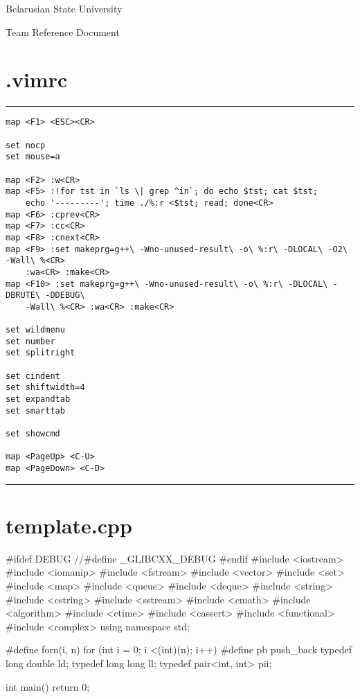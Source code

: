 \documentclass[12pt, titlepage]{article}
\begin{document}
 
\begin{titlepage}
\rule{0pt}{0pt}
\vfill

\centerline{\Huge \textrm{Belarusian State University}}
\vskip 5mm
\centerline{\Large \textsf{Team Reference Document}}

\vfill
\rule{0pt}{0pt}
\end{titlepage}

\section*{.vimrc}

{\color{linescolor}\hrule\vskip2mm}
{\footnotesize\begin{verbatim}
map <F1> <ESC><CR>

set nocp
set mouse=a

map <F2> :w<CR>
map <F5> :!for tst in `ls \| grep ^in`; do echo $tst; cat $tst;
    echo '---------'; time ./%:r <$tst; read; done<CR> 
map <F6> :cprev<CR>
map <F7> :cc<CR>
map <F8> :cnext<CR>
map <F9> :set makeprg=g++\ -Wno-unused-result\ -o\ %:r\ -DLOCAL\ -O2\ -Wall\ %<CR>
    :wa<CR> :make<CR>
map <F10> :set makeprg=g++\ -Wno-unused-result\ -o\ %:r\ -DLOCAL\ -DBRUTE\ -DDEBUG\
    -Wall\ %<CR> :wa<CR> :make<CR>

set wildmenu
set number
set splitright

set cindent
set shiftwidth=4
set expandtab
set smarttab

set showcmd

map <PageUp> <C-U>
map <PageDown> <C-D> 
\end{verbatim}
}{\vskip2mm\color{linescolor}\hrule}

\newpage\section*{template.cpp}
\begin{cppcode}
#ifdef DEBUG
//#define _GLIBCXX_DEBUG
#endif
#include <iostream>
#include <iomanip>
#include <fstream>
#include <vector>
#include <set>
#include <map>
#include <queue>
#include <deque>
#include <string>
#include <cstring>
#include <sstream>
#include <cmath>
#include <algorithm>
#include <ctime>
#include <cassert>
#include <functional>
#include <complex>
using namespace std;

#define forn(i, n) for (int i = 0; i <(int)(n); i++)
#define pb push_back
typedef long double ld;
typedef long long ll;
typedef pair<int, int> pii;


int main() {
    return 0;
}
\end{cppcode}
\end{document}
